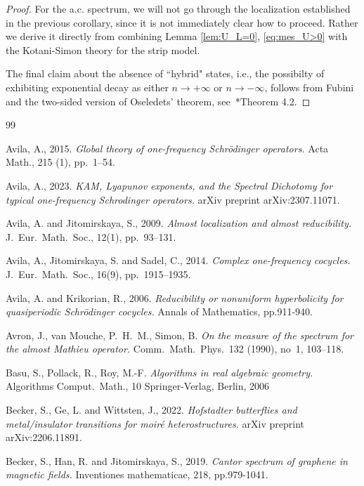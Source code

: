 \documentclass[11pt]{amsart}
\begin{document}
\begin{proof}
 For the a.c. spectrum, we will not go through the localization established in the previous corollary, since it is not immediately clear how to proceed. Rather we derive it directly from combining Lemma \ref{lem:U_L=0}, \eqref{eq:mes_U>0} with the Kotani-Simon theory \cite{KS} for the strip model.


 
 The final claim about the absence of ``hybrid" states, i.e., the possibilty of exhibiting exponential decay as either $n\to+\infty$ or $n\to-\infty$, follows from Fubini and the two-sided version of Oseledets' theorem, see~\cite{V}*{Theorem 4.2}.
 \end{proof}
 

\begin{thebibliography}{99}

 Avila, A., 2015. {\em Global theory of one-frequency Schr\"odinger operators.} Acta Math., 215 (1), pp.\ 1--54.

Avila, A., 2023. {\em KAM, Lyapunov exponents, and the Spectral Dichotomy for typical one-frequency Schrodinger operators.} arXiv preprint arXiv:2307.11071.

 Avila, A. and Jitomirskaya, S., 2009. {\em Almost localization and almost reducibility.} J.\ Eur.\ Math.\ Soc., 12(1), pp.\ 93--131.

 Avila, A., Jitomirskaya, S. and Sadel, C., 2014. {\em Complex one-frequency cocycles.} J.\ Eur.\ Math.\ Soc., 16(9), pp.~1915--1935.

Avila, A. and Krikorian, R., 2006. {\em Reducibility or nonuniform hyperbolicity for quasiperiodic Schrödinger cocycles.} Annals of Mathematics, pp.911-940.

 Avron, J., van Mouche, P.\ H.\ M.,  Simon, B. {\em On the measure of the spectrum for the almost Mathieu operator.} Comm.\ Math.\ Phys.\ 132 (1990), no~1, 103--118.

Basu, S.,  Pollack, R.,  Roy, M.-F. {\em   Algorithms in real algebraic geometry.} 
Algorithms Comput.\ Math., 10
Springer-Verlag, Berlin, 2006

Becker, S., Ge, L. and Wittsten, J., 2022. {\em Hofstadter butterflies and metal/insulator transitions for moir\'e heterostructures.} arXiv preprint arXiv:2206.11891.

Becker, S., Han, R. and Jitomirskaya, S., 2019. {\em Cantor spectrum of graphene in magnetic fields.} Inventiones mathematicae, 218, pp.979-1041.



\end{thebibliography}
\end{document}
